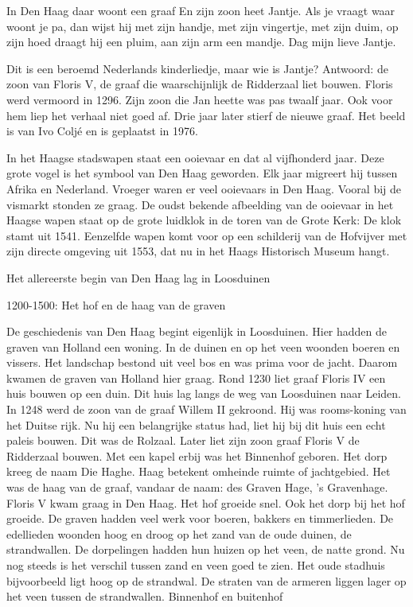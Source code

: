 \documentclass[
  a4paper,
]{book}
\begin{document}
In Den Haag daar woont een graaf
En zijn zoon heet Jantje.
Als je vraagt waar woont je pa,
dan wijst hij met zijn handje,
met zijn vingertje, met zijn duim,
op zijn hoed draagt hij een pluim,
aan zijn arm een mandje.
Dag mijn lieve Jantje.

Dit is een beroemd Nederlands kinderliedje,
maar wie is Jantje?
Antwoord: de zoon van Floris V, de graaf die waarschijnlijk de Ridderzaal liet bouwen. Floris werd vermoord in 1296. Zijn zoon die Jan heette was pas twaalf jaar. Ook voor hem liep het verhaal niet goed af. Drie jaar later stierf de nieuwe graaf.
Het beeld is van Ivo Coljé en is geplaatst in 1976.

In het Haagse stadswapen staat een ooievaar en dat al vijfhonderd jaar. Deze grote vogel is het symbool van Den Haag geworden. Elk jaar migreert hij tussen Afrika en Nederland. Vroeger waren er veel ooievaars in Den Haag. Vooral bij de vismarkt stonden ze graag.
De oudst bekende afbeelding van de ooievaar in het Haagse wapen staat op de grote luidklok in de toren van de Grote Kerk: De klok stamt uit 1541. Eenzelfde wapen komt voor op een schilderij van de Hofvijver met zijn directe omgeving uit 1553, dat nu in het Haags Historisch Museum hangt.

Het allereerste begin van Den Haag lag in Loosduinen

1200-1500: Het hof en de haag van de graven

De geschiedenis van Den Haag begint eigenlijk in Loosduinen.
Hier hadden de graven van Holland een woning.
In de duinen en op het veen woonden boeren en vissers.
Het landschap bestond uit veel bos en was prima voor de jacht.
Daarom kwamen de graven van Holland hier graag.
Rond 1230 liet graaf Floris IV een huis bouwen op een duin.
Dit huis lag langs de weg van Loosduinen naar Leiden.
In 1248 werd de zoon van de graaf Willem II gekroond.
Hij was rooms-koning van het Duitse rijk.
Nu hij een belangrijke status had, liet hij bij dit huis een echt paleis bouwen.
Dit was de Rolzaal.
Later liet zijn zoon graaf Floris V de Ridderzaal bouwen.
Met een kapel erbij was het Binnenhof geboren.
Het dorp kreeg de naam Die Haghe.
Haag betekent omheinde ruimte of jachtgebied.
Het was de haag van de graaf, vandaar de naam: des Graven Hage, 's Gravenhage.
Floris V kwam graag in Den Haag. Het hof groeide snel.
Ook het dorp bij het hof groeide.
De graven hadden veel werk voor boeren, bakkers en timmerlieden.
De edellieden woonden hoog en droog op het zand van de oude duinen, de strandwallen.
De dorpelingen hadden hun huizen op het veen, de natte grond.
Nu nog steeds is het verschil tussen zand en veen goed te zien.
Het oude stadhuis bijvoorbeeld ligt hoog op de strandwal.
De straten van de armeren liggen lager op het veen tussen de strandwallen.
Binnenhof en buitenhof
\end{document}
